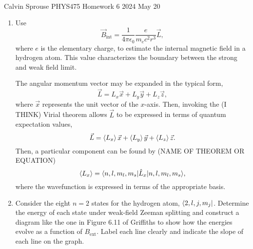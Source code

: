 \documentclass[a4paper, 12pt]{config/homework}
\begin{document}
\noindent
Calvin Sprouse \hfill PHYS475 Homework 6 \hfill 2024 May 20
\bigskip

\begin{enumerate}
\item Use
\[\vec{B}_\text{int} = \frac{1}{4\pi \epsilon_0} \frac{e}{m_e c^2 r^3} \vec{L},\]
where \(e\) is the elementary charge, to estimate the internal magnetic field in a hydrogen atom. This value characterizes the boundary between the strong and weak field limit.

\bigskip
The angular momentum vector may be expanded in the typical form,
\[\vec{L} = L_x \vec{x} + L_y \vec{y} + L_z \vec{z},\]
where \(\vec{x}\) represents the unit vector of the \(x\)-axis. Then, invoking the (I THINK) Virial theorem allows \(\vec{L}\) to be expressed in terms of quantum expectation values,
\[\vec{L} = \expval{L_x} \vec{x} + \expval{L_y} \vec{y} + \expval{L_z} \vec{z}.\]
Then, a particular component can be found by (NAME OF THEOREM OR EQUATION)
\[\expval{L_x} = \bra*{n,l,m_l,m_s}\hat{L}_x\ket*{n,l,m_l,m_s},\]
where the wavefunction is expressed in terms of the appropriate basis.

\pagebreak
\item Consider the eight \(n=2\) states for the hydrogen atom, \(\bra*{2, l, j, m_j}\). Determine the energy of each state under weak-field Zeeman splitting and construct a diagram like the one in Figure 6.11 of Griffiths to show how the energies evolve as a function of \(B_\text{ext}\). Label each line clearly and indicate the slope of each line on the graph.



\end{enumerate}
\end{document}
